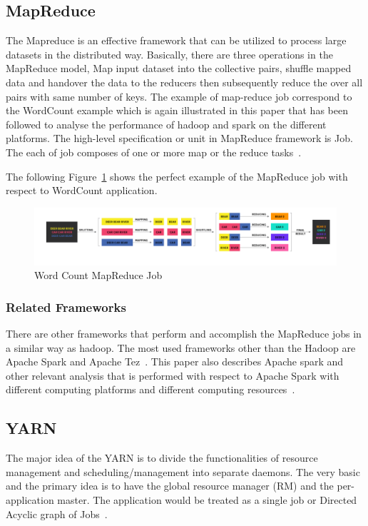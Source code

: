 \subsection{MapReduce}
The Mapreduce is an effective framework that can be 
utilized to process large datasets in the distributed way. 
Basically, there are three operations in the MapReduce model, 
Map input dataset into the collective pairs, 
shuffle mapped data and handover the data to the 
reducers then subsequently reduce the over all pairs 
with same number of keys. The example of 
map-reduce job correspond to the WordCount example 
which is again illustrated in this paper that has 
been followed to analyse the performance of hadoop 
and spark on the different platforms. 
The high-level specification or unit in 
MapReduce framework is Job. The each of 
job composes of one or 
more map or the reduce tasks~\cite{hid-sp18-412-hadoop-architecture-overview}. 

The following Figure~\ref{s:mapreduce} 
shows the perfect example of the 
MapReduce job with respect to WordCount application.

\begin{figure}[!ht]
\centering\includegraphics[width=\textwidth]{images/WordCountMapReduce.png}
\caption{Word Count 
MapReduce 
Job~\cite{hid-sp18-412-hadoop-architecture-overview}}\label{s:mapreduce}
\end{figure}

\subsubsection{Related Frameworks}
There are other frameworks that perform and accomplish the 
MapReduce jobs in a similar way as hadoop. 
The most used frameworks 
other than the Hadoop are Apache Spark and Apache Tez~\cite{hid-sp18-412-tez}. 
This paper also describes Apache spark and other relevant 
analysis that is performed with respect to Apache Spark 
with different computing platforms and
different computing resources~\cite{hid-sp18-412-hadoop-architecture-overview}.

\subsection{YARN}
The major idea of the YARN is to divide the functionalities of
resource management and scheduling/management into 
separate daemons. The very basic and the primary idea 
is to have the global resource manager (RM) and the per-application master. 
The application would be treated as a single job 
or Directed Acyclic 
graph of Jobs~\cite{hid-sp18-412-YARN_Architecture}.

